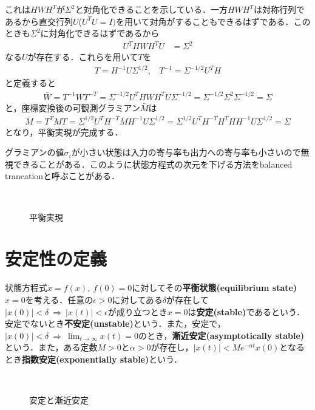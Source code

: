 これは$HWH^T$が$\Sigma^2$と対角化できることを示している．一方$HWH^T$は対称行列であるから直交行列$U$($U^TU=I)$を用いて対角がすることもできるはずである．このときも$\Sigma^2$に対角化できるはずであるから
\begin{align}
	U^T HWH^T U & = \Sigma^2
\end{align}
なる$U$が存在する．これらを用いて$T$を
\begin{align}
	T=H^{-1} U \Sigma^{1/2}
	, \ \ \ \
	T^{-1} = \Sigma^{-1/2} U^T H
\end{align}
と定義すると
\begin{align}
	\bar{W}= T^{-1} W T^{-T} =  \Sigma^{-1/2} U^T H W H^T U \Sigma^{-1/2} 
	=  \Sigma^{-1/2} \Sigma^2 \Sigma^{-1/2} = \Sigma
\end{align}
と，座標変換後の可観測グラミアン$\bar{M}$は
\begin{align}
	\bar{M}= T^T M T = \Sigma^{1/2} U^T H^{-T}M H^{-1} U \Sigma^{1/2}
	= \Sigma^{1/2} U^T H^{-T} H^T H H^{-1} U \Sigma^{1/2} = \Sigma
\end{align}
となり，平衡実現が完成する．

グラミアンの値$\sigma_i$が小さい状態は入力の寄与率も出力への寄与率も小さいので無視できることがある．このように状態方程式の次元を下げる方法をbalanced trancationと呼ぶことがある．


\begin{figure}[htbp]
 \begin{center}
  \caption{平衡実現}
  \label{fig:b_gram}
 \end{center}
\end{figure}


\pagebreak


\section{安定性の定義}

状態方程式$\dot{x}=f(x), \ f(0)=0$に対してその{\bf 平衡状態(equilibrium state)}$x=0$を考える．任意の$\epsilon>0$に対してある$\delta$が存在して$\vert x(0) \vert < \delta \ \Rightarrow \ \vert x(t) \vert < \epsilon$が成り立つとき$x=0$は{\bf 安定(stable)}であるという．安定でないとき{\bf 不安定(unstable)}という．また，安定で，$\vert x(0) \vert < \delta \ \Rightarrow \ \lim_{t \rightarrow \infty} x(t) =0$のとき，{\bf 漸近安定(asymptotically stable)}という．また，ある定数$M>0$と$\alpha>0$が存在し，$\vert x(t) \vert < M e^{-\alpha t} x(0)$となるとき{\bf 指数安定(exponentially stable)}という．

\begin{figure}[htbp]
 \begin{center}
  \caption{安定と漸近安定}
  \label{fig:stability}
 \end{center}
\end{figure}

